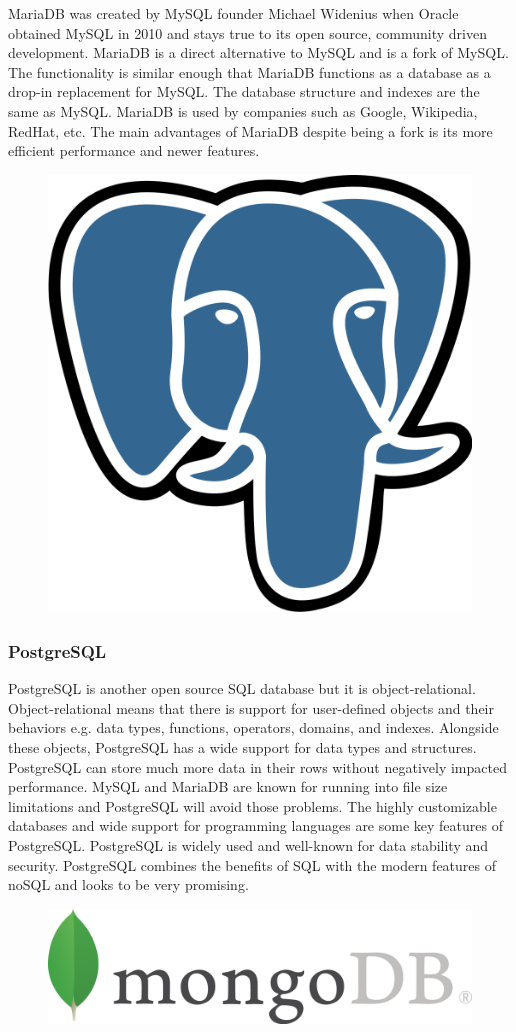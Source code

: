 \documentclass[12pt]{report}
\begin{document}
\begin{enumerate}
MariaDB was created by MySQL founder Michael Widenius when Oracle obtained MySQL in 2010 and stays true to its open source, community driven development.  MariaDB is a direct alternative to MySQL and is a fork of MySQL.  The functionality is similar enough that MariaDB functions as a database as a drop-in replacement for MySQL.  The database structure and indexes are the same as MySQL.  MariaDB is used by companies such as Google, Wikipedia, RedHat, etc.  The main advantages of MariaDB despite being a fork is its more efficient performance and newer features.

\begin{figure}[h]
	\centering
	\includegraphics[width=0.251\linewidth]{postgresql}
\end{figure}

\subsubsection*{PostgreSQL}

PostgreSQL is another open source SQL database but it is object-relational.  Object-relational means that there is support for user-defined objects and their behaviors e.g. data types, functions, operators, domains, and indexes.  Alongside these objects, PostgreSQL has a wide support for data types and structures.  PostgreSQL can store much more data in their rows without negatively impacted performance.  MySQL and MariaDB are known for running into file size limitations and PostgreSQL will avoid those problems.  The highly customizable databases and wide support for programming languages are some key features of PostgreSQL.  PostgreSQL is widely used and well-known for data stability and security.  PostgreSQL combines the benefits of SQL with the modern features of noSQL and looks to be very promising.

\begin{figure}[h]
	\centering
	\includegraphics[width=0.251\linewidth]{mongodb}
\end{figure}


\end{enumerate}
\end{document}
